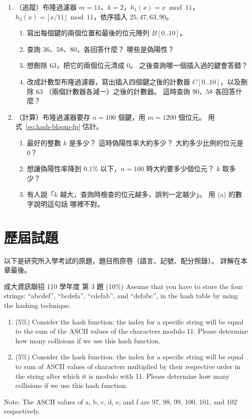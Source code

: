 \begin{enumerate}
\item \label{q:hash-bloom-trace}（追蹤）布隆過濾器 $m = 11$、$k = 2$，$h_1(x) = x \bmod 11$，
$h_2(x) = \lfloor x / 11 \rfloor \bmod 11$，依序插入 $25, 47, 63, 90$。
\begin{enumerate}[nosep]
\item 寫出每個鍵的兩個位置和最後的位元陣列 $B[0..10]$。
\item 查詢 $36$、$58$、$80$，各回答什麼？ 哪些是偽陽性？
\item 想刪除 $63$，把它的兩個位元清成 $0$。 之後查詢哪一個插入過的鍵會答錯？
\item 改成計數型布隆過濾器，寫出插入四個鍵之後的計數器 $C[0..10]$，以及刪除 $63$
（兩個計數器各減一）之後的計數器。 這時查詢 $90$、$58$ 各回答什麼？
\end{enumerate}

\item （計算）布隆過濾器要存 $n = 100$ 個鍵，用 $m = 1200$ 個位元。 用
式~\eqref{eq:hash-bloom-fp} 估計。
\begin{enumerate}[nosep]
\item 最好的整數 $k$ 是多少？ 這時偽陽性率大約多少？ 大約多少比例的位元是 $0$？
\item 想讓偽陽性率降到 $0.1\%$ 以下，$n = 100$ 時大約要多少個位元？ $k$ 取多少？
\item 有人說「$k$ 越大，查詢時檢查的位元越多，誤判一定越少」。 用 (a) 的數字說明這句話
哪裡不對。
\end{enumerate}

\end{enumerate}

\section{歷屆試題}
\label{sec:hash-pastexam}

以下是研究所入學考試的原題，題目照原卷（語言、記號、配分照錄）。 詳解在本章最後。

\begin{pastexam}[label={px:hash-1}]{成大資訊聯招 110 學年度 第 3 題}
(10\%) Assume that you have to store the four strings: ``abcdef'', ``bcdefa'', ``cdefab'', and ``defabc'', in the hash table by using the hashing technique.
\begin{enumerate}[label=(\arabic*),itemsep=0pt,topsep=2pt]
\item (5\%) Consider the hash function: the index for a specific string will be equal to the sum of the ASCII values of the characters modulo 11. Please determine how many collisions if we use this hash function.
\item (5\%) Consider the hash function: the index for a specific string will be equal to sum of ASCII values of characters multiplied by their respective order in the string after which it is modulo with 11. Please determine how many collisions if we use this hash function.
\end{enumerate}
Note: The ASCII values of a, b, c, d, e, and f are 97, 98, 99, 100, 101, and 102 respectively.
\end{pastexam}


